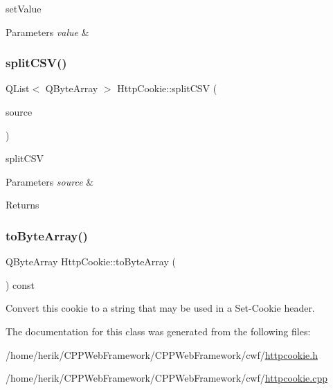 set\+Value 


\begin{DoxyParams}{Parameters}
{\em value} & \\
\hline
\end{DoxyParams}
\mbox{\label{class_http_cookie_a3f086e32413e23fdab53ffefa70b8b0e}} 
\subsubsection{\texorpdfstring{split\+C\+S\+V()}{splitCSV()}}
{\footnotesize\ttfamily Q\+List$<$ Q\+Byte\+Array $>$ Http\+Cookie\+::split\+C\+SV (\begin{DoxyParamCaption}\item[{const Q\+Byte\+Array \&}]{source }\end{DoxyParamCaption})\hspace{0.3cm}{\ttfamily [static]}}



split\+C\+SV 


\begin{DoxyParams}{Parameters}
{\em source} & \\
\hline
\end{DoxyParams}
\begin{DoxyReturn}{Returns}

\end{DoxyReturn}
\mbox{\label{class_http_cookie_aef937847dbebf7290e94b94afbb8f9a1}} 
\subsubsection{\texorpdfstring{to\+Byte\+Array()}{toByteArray()}}
{\footnotesize\ttfamily Q\+Byte\+Array Http\+Cookie\+::to\+Byte\+Array (\begin{DoxyParamCaption}{ }\end{DoxyParamCaption}) const}

Convert this cookie to a string that may be used in a Set-\/\+Cookie header. 

The documentation for this class was generated from the following files\+:\begin{DoxyCompactItemize}
\item 
/home/herik/\+C\+P\+P\+Web\+Framework/\+C\+P\+P\+Web\+Framework/cwf/\hyperlink{httpcookie_8h}{httpcookie.\+h}\item 
/home/herik/\+C\+P\+P\+Web\+Framework/\+C\+P\+P\+Web\+Framework/cwf/\hyperlink{httpcookie_8cpp}{httpcookie.\+cpp}\end{DoxyCompactItemize}
